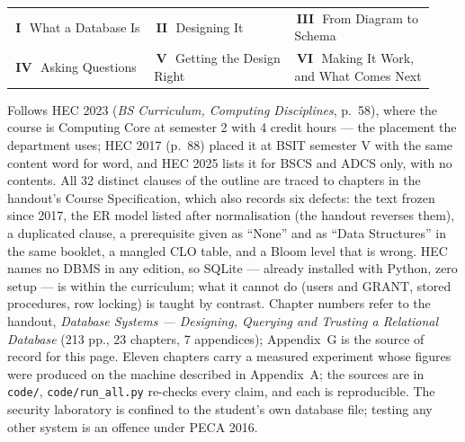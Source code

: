 \documentclass[10pt,a4paper]{article}
\makeatletter
\newcommand{\chipw}[2]{{\setlength{\fboxsep}{1.3pt}\colorbox{#1}{%
  \fontsize{6.4}{7}\selectfont\bfseries\color{white}\,#2\,}}}
\newcommand{\legend}[6]{{\fontsize{6.6}{8}\selectfont\color{sub}%
  \begin{tabular}{@{}p{0.31\linewidth}p{0.31\linewidth}p{0.31\linewidth}@{}}
  \chipw{p1}{I}\ #1 & \chipw{p2}{II}\ #2 & \chipw{p3}{III}\ #3 \\[1pt]
  \chipw{p4}{IV}\ #4 & \chipw{p5}{V}\ #5 & \chipw{p6}{VI}\ #6
  \end{tabular}}}
\makeatother
\begin{document}
\vspace{3pt}
\legend{What a Database Is}{Designing It}{From Diagram to Schema}
       {Asking Questions}{Getting the Design Right}{Making It Work, and What Comes Next}

\vspace{1pt}
{\fontsize{6.3}{7.6}\selectfont\color{neutral}%
Follows HEC 2023 (\emph{BS Curriculum, Computing Disciplines}, p.\ 58), where the course is Computing Core at semester 2 with 4 credit hours --- the placement the department uses; HEC 2017 (p.\ 88) placed it at BSIT semester V with the same content word for word, and HEC 2025 lists it for BSCS and ADCS only, with no contents. All 32 distinct clauses of the outline are traced to chapters in the handout's Course Specification, which also records six defects: the text frozen since 2017, the ER model listed after normalisation (the handout reverses them), a duplicated clause, a prerequisite given as ``None'' and as ``Data Structures'' in the same booklet, a mangled CLO table, and a Bloom level that is wrong. HEC names no DBMS in any edition, so SQLite --- already installed with Python, zero setup --- is within the curriculum; what it cannot do (users and GRANT, stored procedures, row locking) is taught by contrast. Chapter numbers refer to the handout, \emph{Database Systems --- Designing, Querying and Trusting a Relational Database} (213 pp., 23 chapters, 7 appendices); Appendix~G is the source of record for this page. Eleven chapters carry a measured experiment whose figures were produced on the machine described in Appendix~A; the sources are in \texttt{code/}, \texttt{code/run\_all.py} re-checks every claim, and each is reproducible. The security laboratory is confined to the student's own database file; testing any other system is an offence under PECA 2016.\par}
\end{document}
